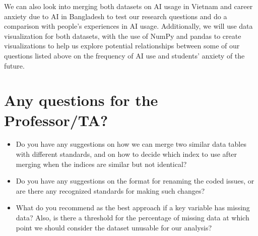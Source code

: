 \documentclass[a4 paper, 12pt]{elsarticle}
\begin{document}
We can also look into merging both datasets on AI usage in Vietnam and career anxiety due to AI in Bangladesh to test our research questions and do a comparison with people’s experiences in AI usage. Additionally, we will use data visualization for both datasets, with the use of NumPy and pandas to create visualizations to help us explore potential relationships between some of our questions listed above on the frequency of AI use and students’ anxiety of the future.


\section*{Any questions for the Professor/TA?}

\begin{itemize}
\item Do you have any suggestions on how we can merge two similar data tables with different standards, and on how to decide which index to use after merging when the indices are similar but not identical?
\item Do you have any suggestions on the format for renaming the coded issues, or are there any recognized standards for making such changes?
\item What do you recommend as the best approach if a key variable has missing data? Also, is there a threshold for the percentage of missing data at which point we should consider the dataset unusable for our analysis? 
\end{itemize}
\end{document}
